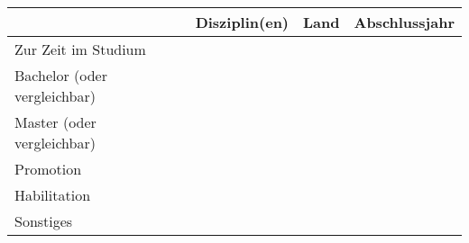 \documentclass{scrartcl}
\begin{document}
\begin{table}[h]
   \centering
   \begin{tabular}{lccc}
      \hline
                                     & \textbf{Disziplin(en)}   & \textbf{Land}   & \textbf{Abschlussjahr}   \\
      \hline\hline
      Zur Zeit im Studium            &                          &                 &                          \\
      Bachelor (oder vergleichbar)   &                          &                 &                          \\
      Master (oder vergleichbar)     &                          &                 &                          \\
      Promotion                      &                          &                 &                          \\
      Habilitation                   &                          &                 &                          \\
      Sonstiges                      &                          &                 &                          \\
      \hline
   \end{tabular}
\end{table}
\end{document}
